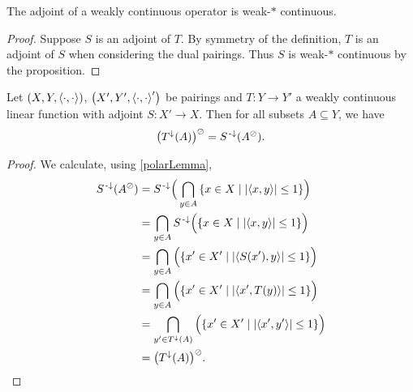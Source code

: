 \begin{corollary} \label{weak*continuityAdjoint}
The adjoint of a weakly continuous operator is weak-$*$ continuous.
\end{corollary}
\begin{proof}
Suppose $S$ is an adjoint of $T$. By symmetry of the definition, $T$ is an adjoint of $S$ when considering the dual pairings. Thus $S$ is weak-$*$ continuous by the proposition.
\end{proof}

\begin{lemma} \label{adjointPreimagePolarLemma}
Let $\left( X,Y,\left\langle \cdot,\cdot \right\rangle \right)$, $\left( X',Y',\left\langle \cdot,\cdot \right\rangle' \right)$ be pairings and $T: Y\to Y'$ a weakly continuous linear function with adjoint $S: X'\to X$. Then for all subsets $A\subseteq Y$, we have
\[ \big(T^{\downarrow}(A)\big)^\oslash = S^{{\text{\hspace{0.15em}-}\downarrow}}(A^\oslash). \]
\end{lemma}
\begin{proof}
We calculate, using \ref{polarLemma},
\begin{align*}
S^{\preimf}(A^\pol) &= S^{\preimf}\Big(\bigcap_{y\in A}\setbuilder{x\in X}{\abspair{x,y}\leq 1}\Big) \\
&= \bigcap_{y\in A}S^{\preimf}\Big(\setbuilder{x\in X}{\abspair{x,y}\leq 1}\Big) \\
&= \bigcap_{y\in A}\Big(\setbuilder{x'\in X'}{\abspair{S(x'),y}\leq 1}\Big) \\
&= \bigcap_{y\in A}\Big(\setbuilder{x'\in X'}{\abspair{x',T(y)}\leq 1}\Big) \\
&= \bigcap_{y'\in T^{\imf}(A)}\Big(\setbuilder{x'\in X'}{\abspair{x',y'}\leq 1}\Big) \\
&= \big(T^{\imf}(A)\big)^\pol.
\end{align*}
\end{proof}

